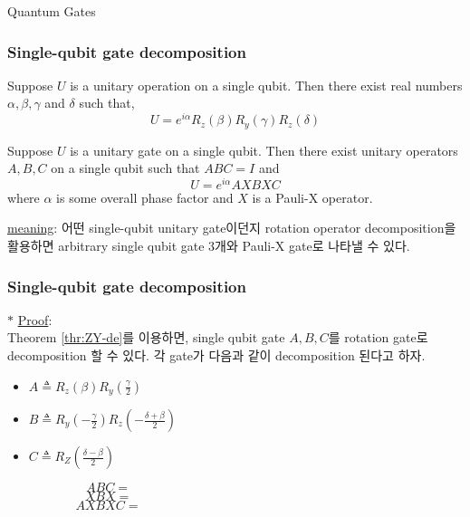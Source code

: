 \documentclass[9pt]{beamer}
\begin{document}
\begin{section}{Quantum Gates}
        \begin{frame}
            \frametitle{Single-qubit gate decomposition}
                \begin{theorem}[ZY decomposition]
                    Suppose $U$ is a unitary operation on a single qubit. Then there exist real numbers $\alpha, \beta, \gamma$ and $\delta$ such that,
                    $$U=e^{i \alpha} R_z(\beta) R_y(\gamma) R_z(\delta)$$
                \end{theorem}\label{thr:ZY-de}
                
                \begin{theorem}
                    Suppose $U$ is a unitary gate on a single qubit. Then there exist unitary operators $A, B, C$ on a single qubit such that $ABC = I$ and
                    $$ U = e^{i\alpha} AXBXC $$
                    where $\alpha$ is some overall phase factor and $X$ is a Pauli-X operator.
                \end{theorem}\label{thr:Pauli-de}
                \vspace{0.2cm}
                \checkmark \underline{meaning}: 어떤 single-qubit unitary gate이던지 rotation operator decomposition을 활용하면 arbitrary single qubit gate 3개와 Pauli-X gate로 나타낼 수 있다.

        \end{frame}

        \begin{frame}
            \frametitle{Single-qubit gate decomposition}
                $\ast$ \underline{Proof}:
                \\Theorem \ref{thr:ZY-de}를 이용하면, single qubit gate $A, B, C$를 rotation gate로 decomposition 할 수 있다. 각 gate가 다음과 같이 decomposition 된다고 하자.
                \begin{itemize}
                    \item $A \triangleq R_z(\beta)R_y\left( \frac{\gamma}{2} \right)$
                    \item $B \triangleq R_y\left( -\frac{\gamma}{2} \right)R_z\left( -\frac{\delta + \beta}{2} \right)$
                    \item $C \triangleq R_Z\left(\frac{\delta-\beta}{2} \right)$
                \end{itemize}
                \vspace{0.8cm}
                $$ABC = \qquad \qquad \qquad \qquad \qquad \qquad \qquad \qquad \qquad \qquad $$
                \vspace{0.4cm}
                $$XBX = \qquad \qquad \qquad \qquad \qquad \qquad \qquad \qquad \qquad \qquad $$
                \vspace{0.4cm}
                $$AXBXC = \qquad \qquad \qquad \qquad \qquad \qquad \qquad \qquad \qquad \qquad $$
        \end{frame}


\end{section}
\end{document}
